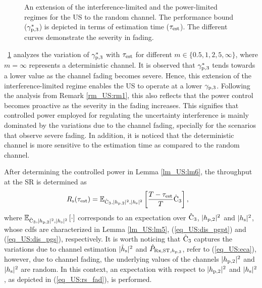 \begin{figure}[!ht]
\caption{An extension of the interference-limited and the power-limited regimes for the US to the random channel. The performance bound (${\gamma}_{\text{p,3}}^*$) is depicted in terms of estimation time ($\tau_{\text{est}}$). The different curves demonstrate the severity in fading.} %
\label{fig_US:or_fad}
\end{figure}
\begin{remark} \label{rm_US:rm2}
\normalfont
\figurename~\ref{fig_US:or_fad} analyzes the variation of ${\gamma}_{\text{p,3}}^*$ with $\tau_{\text{est}}$ for different $m \in \{0.5, 1, 2, 5, \infty\}$, where $m = \infty$ represents a deterministic channel. It is observed that ${\gamma}_{\text{p,3}}^*$ tends towards a lower value as the channel fading becomes severe. Hence, this extension of the interference-limited regime enables the US to operate at a lower ${\gamma}_{\text{p,3}}$. Following the analysis from Remark \ref{rm_US:rm1}, this also reflects that the power control becomes proactive as the severity in the fading increases. This signifies that controlled power employed for regulating the uncertainty interference is mainly dominated by the variations due to the channel fading, specially for the scenarios that observe severe fading. In addition, it is noticed that the deterministic channel is more sensitive to the estimation time as compared to the random channel.  
\end{remark}
After determining the controlled power in Lemma \ref{lm_US:lm6}, the throughput at the SR is determined as
\begin{align}
R_{\text{s}}(\tau_{\text{est}}) &= {\mathbb E}_{\hat{\text{{C}}}_{\text{3}}, |h_{\text{p,2}}|^2, |h_{\text{s}}|^2}\left[ \frac{T - \tau_{\text{est}}}{T} \hat{\text{{C}}}_{\text{3}}  \right], \label{eq_US:rs_fad} 
\end{align} 
where ${\mathbb E}_{\hat{\text{{C}}}_{\text{3}}, |h_{\text{p,2}}|^2, |h_{\text{s}}|^2}\left[ \cdot \right]$ corresponds to an expectation over $\hat{\text{{C}}}_{\text{3}}$, $|h_{\text{p,2}}|^2$ and $|h_{\text{s}}|^2$, whose cdfs are characterized in Lemma \ref{lm_US:lm5}, (\ref{eq_US:dis_pgpt}) and (\ref{eq_US:dis_pgs}), respectively. It is worth noticing that $\hat{\text{{C}}}_{\text{3}}$ captures the variations due to channel estimation $|\hat{h}_{\text{s}}|^2$ and $\hat{P}_{\text{Rx,ST,$h_{\text{p,3}}$}}$, refer to (\ref{eq_US:eca}), however, due to channel fading, the underlying values of the channels $|h_{\text{p,2}}|^2$ and $|h_{\text{s}}|^2$ are random. In this context, an expectation with respect to $|h_{\text{p,2}}|^2$ and $|h_{\text{s}}|^2$, as depicted in (\ref{eq_US:rs_fad}), is performed.

